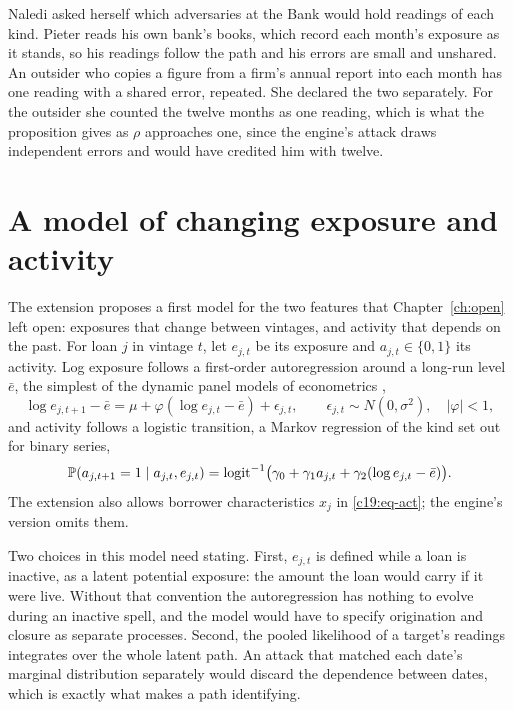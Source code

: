 Naledi asked herself which adversaries at the Bank would hold readings of each kind.
Pieter reads his own bank's books, which record each month's exposure as it stands, so his
readings follow the path and his errors are small and unshared. An outsider who copies
a figure from a firm's annual report into each month has one reading with a shared error,
repeated. She declared the two separately. For the outsider she counted the twelve months
as one reading, which is what the proposition gives as $\rho$ approaches one, since the engine's
attack draws independent errors and would have credited him with twelve.

\section{A model of changing exposure and activity}

The extension proposes a first model for the two features that Chapter~\ref{ch:open} left open: exposures
that change between vintages, and activity that depends on the past. For loan $j$ in
vintage $t$, let $e_{j,t}$ be its exposure and $a_{j,t}\in\{0,1\}$ its activity. Log exposure follows a first-order autoregression around a long-run level $\bar e$, the simplest of the dynamic panel models of
econometrics \citep{arellano1991},
\begin{equation}\label{c19:eq-ar}
\log e_{j,t+1}-\bar e=\mu+\varphi(\log e_{j,t}-\bar e)+\epsilon_{j,t},\qquad\epsilon_{j,t}\sim N(0,\sigma^2),\quad|\varphi|<1,
\end{equation}
and activity follows a logistic transition, a Markov regression of the kind \citet{zeger1988} set out for binary series,
\begin{equation}\label{c19:eq-act}
\mathbb{P}(a_{j,t+1}=1\mid a_{j,t},e_{j,t})=\operatorname{logit}^{-1}\!\big(\gamma_0+\gamma_1a_{j,t}+\gamma_2(\log e_{j,t}-\bar e)\big).
\end{equation}
The extension also allows borrower characteristics $x_j$ in \eqref{c19:eq-act}; the engine's version omits
them.

Two choices in this model need stating. First, $e_{j,t}$ is defined while a loan is inactive,
as a latent potential exposure: the amount the loan would carry if it were live. Without
that convention the autoregression has nothing to evolve during an inactive spell, and the
model would have to specify origination and closure as separate processes. Second, the
pooled likelihood of a target's readings integrates over the whole latent path. An attack
that matched each date's marginal distribution separately would discard the dependence
between dates, which is exactly what makes a path identifying.

